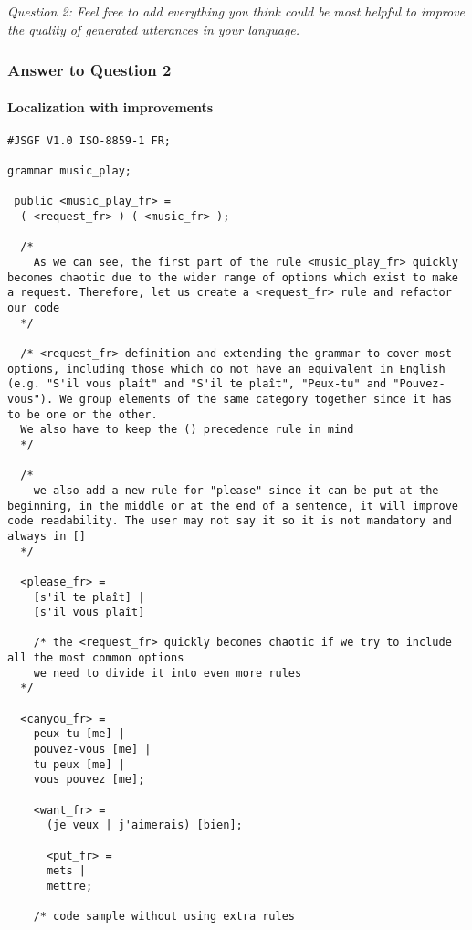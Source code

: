\documentclass[12pt, a4paper]{article}
\begin{document}
\emph{Question 2: Feel free to add everything you think could be most helpful to improve the quality of generated utterances in your language.}

\subsubsection{Answer to Question 2}

\paragraph{Localization with improvements}\mbox{}

\begin{lstlisting}
#JSGF V1.0 ISO-8859-1 FR;

grammar music_play;

 public <music_play_fr> =
  ( <request_fr> ) ( <music_fr> );
  
  /*
    As we can see, the first part of the rule <music_play_fr> quickly becomes chaotic due to the wider range of options which exist to make a request. Therefore, let us create a <request_fr> rule and refactor our code
  */
  
  /* <request_fr> definition and extending the grammar to cover most options, including those which do not have an equivalent in English (e.g. "S'il vous plaît" and "S'il te plaît", "Peux-tu" and "Pouvez-vous"). We group elements of the same category together since it has to be one or the other.
  We also have to keep the () precedence rule in mind
  */
  
  /*
    we also add a new rule for "please" since it can be put at the beginning, in the middle or at the end of a sentence, it will improve code readability. The user may not say it so it is not mandatory and always in []
  */
  
  <please_fr> = 
    [s'il te plaît] |
    [s'il vous plaît]
    
    /* the <request_fr> quickly becomes chaotic if we try to include all the most common options
    we need to divide it into even more rules
  */
  
  <canyou_fr> = 
    peux-tu [me] |
    pouvez-vous [me] |
    tu peux [me] |
    vous pouvez [me];
    
    <want_fr> =
      (je veux | j'aimerais) [bien];
      
      <put_fr> =
      mets |
      mettre;
    
    /* code sample without using extra rules
    

\end{lstlisting}
\end{document}
